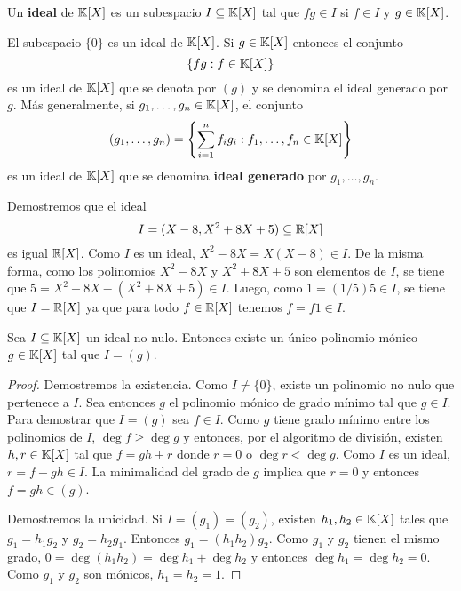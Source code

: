 \begin{block}
	Un \textbf{ideal} de $\mathbb{K}[X]$ es un subespacio $I\subseteq\mathbb{K}[X]$ tal que
	$fg\in I$ si $f\in I$ y $g\in\mathbb{K}[X]$.
\end{block}

\begin{examples}
    El subespacio $\{0\}$ es un ideal de $\mathbb{K}[X]$. Si $g\in\mathbb{K}[X]$ entonces
    el conjunto 
    \[
        \{fg:f\in\mathbb{K}[X]\}
    \]
    es un ideal de $\mathbb{K}[X]$ que se denota por $(g)$ y se denomina el ideal
    generado por $g$.  Más generalmente, si $g_1,\dots,g_n\in\mathbb{K}[X]$, el conjunto
    \[
    (g_1,\dots,g_n)=\left\{\sum_{i=1}^n f_ig_i:f_1,\dots,f_n\in\mathbb{K}[X]\right\}
    \]
    es un ideal de $\mathbb{K}[X]$ que se denomina \textbf{ideal generado} por
    $g_1,\dots,g_n$.
\end{examples}

\begin{example}
	Demostremos que el ideal 
    \[
        I=(X-8,X^2+8X+5)\subseteq\mathbb{R}[X]
    \]
	es igual $\mathbb{R}[X]$.  Como $I$ es un ideal, $X^2-8X=X(X-8)\in I$. De la misma
	forma, como los polinomios $X^2-8X$ y $X^2+8X+5$ son elementos de $I$, se
	tiene que $5=X^2-8X-(X^2+8X+5)\in I$. Luego, como $1=(1/5)5\in I$, se tiene
	que $I=\mathbb{R}[X]$ ya que para todo $f\in\mathbb{R}[X]$ tenemos $f=f1\in I$. 
\end{example}

\begin{thm}
	Sea $I\subseteq\mathbb{K}[X]$ un ideal no nulo. Entonces existe un único polinomio
	mónico $g\in\mathbb{K}[X]$ tal que $I=(g)$. 

    \begin{proof}
		Demostremos la existencia.  Como $I\ne\{0\}$, existe un polinomio no
		nulo que pertenece a $I$. Sea entonces $g$ el polinomio mónico de grado
		mínimo tal que $g\in I$. Para demostrar que $I=(g)$ sea $f\in I$. Como
		$g$ tiene grado mínimo entre los polinomios de $I$, $\deg f\geq \deg g$
		y entonces, por el algoritmo de división, existen $h,r\in\mathbb{K}[X]$ tal que
		$f=gh+r$ donde $r=0$ o $\deg r<\deg g$. Como $I$ es un ideal,
		$r=f-gh\in I$.  La minimalidad del grado de $g$ implica que $r=0$ y
		entonces $f=gh\in(g)$. 

		Demostremos la unicidad. Si $I=(g_1)=(g_2)$, existen $h_1,h_2\in\mathbb{K}[X]$
		tales que $g_1=h_1g_2$ y $g_2=h_2g_1$. Entonces $g_1=(h_1h_2)g_2$. Como
		$g_1$ y $g_2$ tienen el mismo grado, $0=\deg(h_1h_2)=\deg h_1+\deg h_2$
		y entonces $\deg h_1=\deg h_2=0$.  Como $g_1$ y $g_2$ son mónicos,
		$h_1=h_2=1$.
    \end{proof}
\end{thm}

